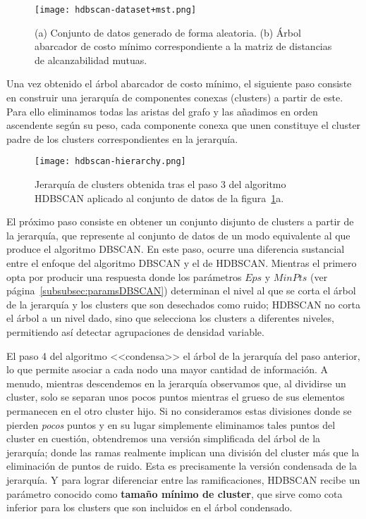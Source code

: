 \begin{figure}[!h]
    \centering
    \texttt{[image: hdbscan-dataset+mst.png]}
    \caption{(a) Conjunto de datos generado de forma aleatoria. (b) Árbol abarcador de costo mínimo correspondiente a la matriz de distancias de alcanzabilidad mutuas.}
    \label{img:hdbscan-dataset+mst}
\end{figure}

Una vez obtenido el árbol abarcador de costo mínimo, el siguiente paso consiste en construir una jerarquía de componentes conexas (clusters) a partir de este.
Para ello eliminamos todas las aristas del grafo y las añadimos en orden ascendente según su peso, cada componente conexa que unen constituye el cluster padre de los clusters correspondientes en la jerarquía.

\begin{figure}[!h]
    \centering
    \texttt{[image: hdbscan-hierarchy.png]}
    \caption{Jerarquía de clusters obtenida tras el paso 3 del algoritmo HDBSCAN aplicado al conjunto de datos de la figura~\ref{img:hdbscan-dataset+mst}a.}
    \label{img:hdbscan-hierarchy}
\end{figure}

El próximo paso consiste en obtener un conjunto disjunto de clusters a partir de la jerarquía, que represente al conjunto de datos de un modo equivalente al que produce el algoritmo DBSCAN\@.
En este paso, ocurre una diferencia sustancial entre el enfoque del algoritmo DBSCAN y el de HDBSCAN\@.
Mientras el primero opta por producir una respuesta donde los parámetros $Eps$ y $MinPts$ (ver página~\ref{subsubsec:paramsDBSCAN}) determinan el nivel al que se corta el árbol de la jerarquía y los clusters que son desechados como ruido;
HDBSCAN no corta el árbol a un nivel dado, sino que selecciona los clusters a diferentes niveles, permitiendo así detectar agrupaciones de densidad variable.

El paso 4 del algoritmo <<condensa>> el árbol de la jerarquía del paso anterior, lo que permite asociar a cada nodo una mayor cantidad de información.
A menudo, mientras descendemos en la jerarquía observamos que, al dividirse un cluster, solo se separan unos pocos puntos mientras el grueso de sus elementos permanecen en el otro cluster hijo.
Si no consideramos estas divisiones donde se pierden \textit{pocos} puntos y en su lugar simplemente eliminamos tales puntos del cluster en cuestión, obtendremos una versión simplificada del árbol de la jerarquía;
donde las ramas realmente implican una división del cluster más que la eliminación de puntos de ruido.
Esta es precisamente la versión condensada de la jerarquía.
Y para lograr diferenciar entre las ramificaciones, HDBSCAN recibe un parámetro conocido como \textbf{tamaño mínimo de cluster}, que sirve como cota inferior para los clusters que son incluidos en el árbol condensado.

